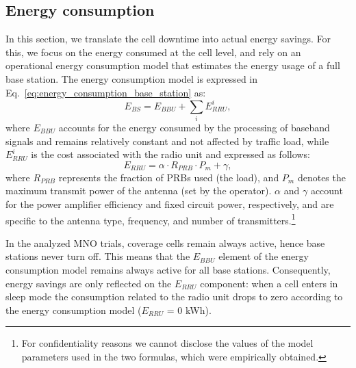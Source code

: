 \vspace{-2pt}
\subsection{Energy consumption}
\vspace{-2pt}

In this section, we translate the cell downtime into actual energy savings. 
For this, we focus on the energy consumed at the cell level, and rely on an operational energy consumption model that estimates the energy usage of a full base station\cite{energy_consumption_formula}. The energy consumption model is 
expressed in Eq.~\ref{eq:energy_consumption_base_station} as:
\begin{equation}
    E_{BS} = E_{BBU} + \sum_{i} E^{i}_{RRU},
    \label{eq:energy_consumption_base_station}
\end{equation}
where $E_{BBU}$ accounts for the energy consumed by the processing of baseband signals and remains relatively constant and not affected by traffic load, while $E^{i}_{RRU}$ is the cost associated with the radio unit and expressed as follows:
\begin{equation}
    E_{RRU} = \alpha \cdot R_{PRB} \cdot P_{m} + \gamma,
    \label{eq:energy_consumption_radio_unit}
\end{equation}
where  $R_{PRB}$ represents the fraction of PRBs used (\ie the load), and $P_{m}$ denotes the maximum transmit power of the antenna (set by the operator). $\alpha$ and $\gamma$ account for the power amplifier efficiency and fixed circuit power, respectively, and are specific to the antenna type, frequency, and number of transmitters.\footnote{For confidentiality reasons we cannot disclose the values of the model parameters used in the two formulas, which were empirically obtained.} 

In the analyzed MNO trials, coverage cells remain always active, hence base stations never turn off. This means that the $E_{BBU}$ element of the energy consumption model remains always active %
for all base stations.
Consequently, energy savings are only reflected on the $E_{RRU}$ component: when a cell enters in sleep mode the consumption related to the radio unit drops to zero according to the energy consumption model (\ie $E_{RRU}$ = 0 kWh). 

